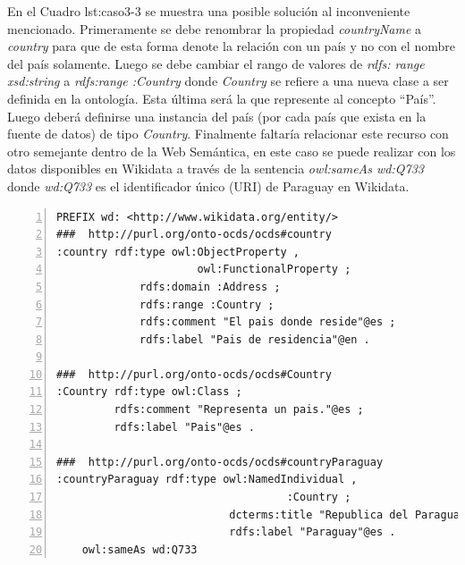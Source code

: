  En el Cuadro {lst:caso3-3} se muestra una posible solución al inconveniente mencionado. Primeramente se debe renombrar la propiedad \textit{countryName} a \textit{country} para que de esta forma denote la relación con un país y no con el nombre del país solamente. Luego se debe cambiar el rango de valores de \textit{rdfs: range xsd:string}  a \textit{rdfs:range :Country }donde \textit{Country} se refiere a una nueva clase a ser definida en la ontología. Esta última será la que represente al concepto “País”. Luego deberá definirse una instancia del país (por cada país que exista en la fuente de datos) de tipo \textit{Country}. Finalmente faltaría relacionar este recurso con otro semejante dentro de la Web Semántica, en este caso se puede realizar con los datos disponibles en Wikidata a través de la sentencia \textit{owl:sameAs wd:Q733} donde \textit{wd:Q733} es el identificador único (URI) de Paraguay en Wikidata.\hfill \break

\noindent\begin{minipage}[c]{\textwidth}
 \begin{lstlisting}[captionpos=b, caption=Declaracion de la Clase Country, label={lst:caso3-3},  numbers=left,  numberstyle=\tiny\color{mygray},
    basicstyle=\footnotesize\ttfamily,frame=single]
PREFIX wd: <http://www.wikidata.org/entity/>
###  http://purl.org/onto-ocds/ocds#country
:country rdf:type owl:ObjectProperty ,
                      owl:FunctionalProperty ;
             rdfs:domain :Address ;
             rdfs:range :Country ;
             rdfs:comment "El pais donde reside"@es ;
             rdfs:label "Pais de residencia"@en .

###  http://purl.org/onto-ocds/ocds#Country
:Country rdf:type owl:Class ;
         rdfs:comment "Representa un pais."@es ;
         rdfs:label "Pais"@es .

###  http://purl.org/onto-ocds/ocds#countryParaguay
:countryParaguay rdf:type owl:NamedIndividual ,
                                    :Country ;
                           dcterms:title "Republica del Paraguay"@es ;
                           rdfs:label "Paraguay"@es .
    owl:sameAs wd:Q733
 \end{lstlisting}
\end{minipage}
